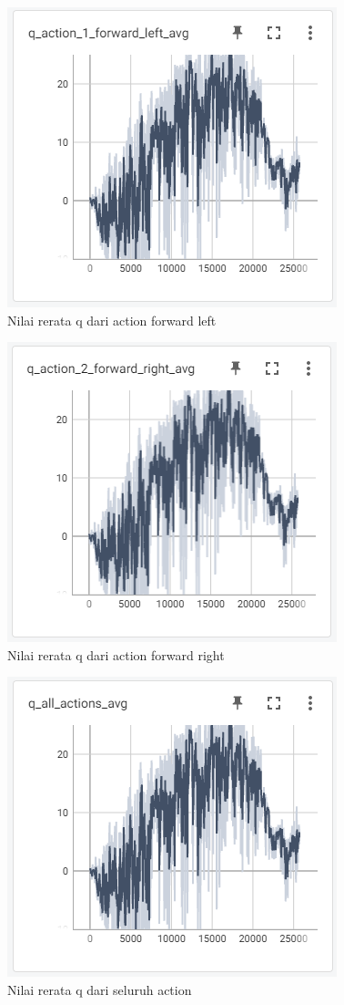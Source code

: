 \begin{figure}[H] 
	\centering
	\includegraphics[width=.7\linewidth]{images/q_action_1_forward_left_avg}
	\caption{Nilai rerata q dari action forward left}
	\label{fig:q_action_1_forward_left_avg}
\end{figure}
\begin{figure}[H] 
	\centering
	\includegraphics[width=.7\linewidth]{images/q_action_2_forward_right_avg}
	\caption{Nilai rerata q dari action forward right}
	\label{fig:q_action_2_forward_right_avg}
\end{figure}
\begin{figure}[H] 
	\centering
	\includegraphics[width=.7\linewidth]{images/q_all_actions_avg}
	\caption{Nilai rerata q dari seluruh action}
	\label{fig:q_all_actions_avg}
\end{figure}

